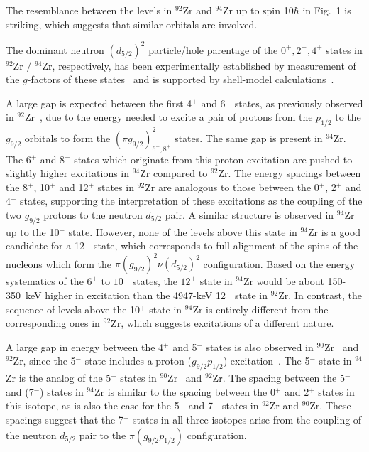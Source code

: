  The resemblance between the levels in $^{92}$Zr and $^{94}$Zr up to spin
10$\hbar$ in Fig.~1 is striking, which suggests that similar orbitals 
are involved.

The dominant neutron $(d_{5/2})^2$ particle/hole parentage of the $0^+, 2^+, 4^+$ states in $^{92}$Zr / $^{94}$Zr, respectively,
has been experimentally established by measurement of the $g$-factors of these
states~\cite{Jak} and is supported by shell-model calculations~\cite{Cha}.

 A large gap is expected between the first 4$^{+}$ and 6$^{+}$ states, as 
previously observed in $^{92}$Zr~\cite{Bro}, due to the energy needed to excite a
pair of protons from the $p_{1/2}$ to the $g_{9/2}$ orbitals to form the 
$(\pi g_{9/2})^2_{6^+,8^+}$ states.  The same gap is
present in $^{94}$Zr. The 6$^{+}$ and 8$^{+}$ states which originate from this 
proton excitation are pushed to slightly higher excitations in 
$^{94}$Zr compared to $^{92}$Zr. The energy spacings between the
8$^{+}$, 10$^{+}$ and 12$^{+}$ states in $^{92}$Zr are 
analogous to those between the 0$^{+}$, 2$^{+}$ and 4$^{+}$ states, supporting
the interpretation of these excitations as the coupling of the 
two $g_{9/2}$ protons to the
neutron $d_{5/2}$ pair.  A similar structure is observed in 
$^{94}$Zr up to the 10$^{+}$
state. However, none of the levels above this state in $^{94}$Zr is a good candidate for a
12$^{+}$ state, which corresponds to full alignment of the spins of the 
nucleons which form the $\pi (g_{9/2})^2 \nu (d_{5/2})^2$ configuration. 
Based on the energy systematics of the $6^+$ to $10^+$ states, 
the $12^+$ state in $^{94}$Zr would be about 150-350~keV higher 
in excitation than the 4947-keV 12$^{+}$ state in
$^{92}$Zr. In contrast, the sequence of levels above the 
10$^{+}$ state in $^{94}$Zr
is entirely different from the corresponding ones in $^{92}$Zr, 
which suggests excitations
of a different nature. 

A large gap in energy between the 4$^+$ and 5$^-$ states is also observed in 
$^{90}$Zr~\cite{TOI} and $^{92}$Zr, 
since the 5$^-$ state includes a proton ($g_{9/2} p_{1/2}$)
excitation~\cite{Bro}.
The 5$^{-}$ state in $^{94}$Zr is the 
analog of the 5$^{-}$
states in $^{90}$Zr~\cite{TOI} and $^{92}$Zr. 
The spacing between the 5$^{-}$ and (7$^{-}$) states in $^{94}$Zr is
similar to the spacing between the 0$^{+}$ and 2$^{+}$ states in this isotope, 
as is also the case for the 5$^{-}$ and 7$^{-}$ states in $^{92}$Zr and 
$^{90}$Zr.  These spacings suggest that the 7$^{-}$ states in all three
isotopes arise from the coupling of the neutron $d_{5/2}$ pair to
the $\pi (g_{9/2} p_{1/2})$ configuration.

